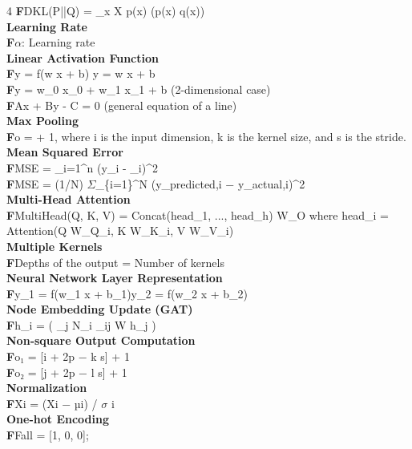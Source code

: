 \documentclass[8pt]{extarticle}
\newcommand{\ftag}{\textcolor{formulacolor}{\tiny\textbf{F}}\;}
\begin{document}
\begin{multicols}{4}
\ftag DKL(P||Q) = \sum\_{x \in X} p(x) \log(p(x) q(x))\\
\vspace{2pt}\textbf{Learning Rate}\\
\ftag $\alpha$: Learning rate\\
\vspace{2pt}\textbf{Linear Activation Function}\\
\ftag y = f(w \cdot x + b) \rightarrow y = w \cdot x + b\\
\ftag y = w\_0 x\_0 + w\_1 x\_1 + b (2-dimensional case)\\
\ftag Ax + By - C = 0 (general equation of a line)\\
\vspace{2pt}\textbf{Max Pooling}\\
\ftag o = \left\lfloor {} \right\rfloor + 1, where i is the input dimension, k is the kernel size, and s is the stride.\\
\vspace{2pt}\textbf{Mean Squared Error}\\
\ftag MSE =  \sum\_{i=1}\textasciicircum{}{n} (y\_{i} - \_{i})\textasciicircum{}{2}\\
\ftag MSE = (1/N) $\Sigma$\_\{i=1\}\textasciicircum{}{N} (y\_predicted,i − y\_actual,i)\textasciicircum{}2\\
\vspace{2pt}\textbf{Multi-Head Attention}\\
\ftag MultiHead(Q, K, V) = Concat(head\_1, ..., head\_h) W\_O where head\_i = Attention(Q W\_{Q\_i}, K W\_{K\_i}, V W\_{V\_i})\\
\vspace{2pt}\textbf{Multiple Kernels}\\
\ftag Depths of the output = Number of kernels\\
\vspace{2pt}\textbf{Neural Network Layer Representation}\\
\ftag y\_1 = f(w\_1 \cdot x + b\_1)\quad y\_2 = f(w\_2 \cdot x + b\_2)\\
\vspace{2pt}\textbf{Node Embedding Update (GAT)}\\
\ftag h\_i = \sigma\Big( \sum\_{j \in N\_i} \alpha\_{ij} W h\_j \Big)\\
\vspace{2pt}\textbf{Non‑square Output Computation}\\
\ftag o₁ = [i + 2p − k s] + 1\\
\ftag o₂ = [j + 2p − l s] + 1\\
\vspace{2pt}\textbf{Normalization}\\
\ftag Xi = (Xi − µi) / $\sigma$ i\\
\vspace{2pt}\textbf{One-hot Encoding}\\
\ftag Fall = [1, 0, 0];




\end{multicols}
\end{document}
